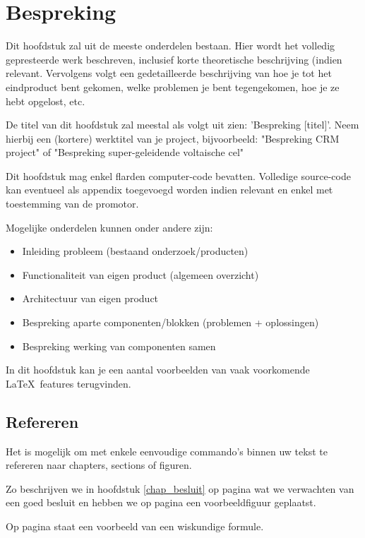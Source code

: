 \chapter[Bespreking]{Bespreking}
\label{chap_bespreking}

Dit hoofdstuk zal uit de meeste onderdelen bestaan. Hier wordt het volledig gepresteerde werk beschreven, inclusief korte theoretische beschrijving (indien relevant. 
Vervolgens volgt een gedetailleerde beschrijving van hoe je tot het eindproduct bent gekomen, welke problemen je bent tegengekomen, hoe je ze hebt opgelost, etc.

De titel van dit hoofdstuk zal meestal als volgt uit zien: 'Bespreking [titel]'. Neem hierbij een (kortere) werktitel van je project, bijvoorbeeld: "Bespreking CRM project" of "Bespreking super-geleidende voltaische cel"

Dit hoofdstuk mag enkel flarden computer-code bevatten. Volledige source-code kan eventueel als appendix toegevoegd worden indien relevant en enkel met toestemming van de promotor.

Mogelijke onderdelen kunnen onder andere zijn:
\begin{itemize}
  \item Inleiding probleem (bestaand onderzoek/producten) 
  \item Functionaliteit van eigen product (algemeen overzicht)
  \item Architectuur van eigen product
  \item Bespreking aparte componenten/blokken (problemen + oplossingen)
  \item Bespreking werking van componenten samen
\end{itemize}


In dit hoofdstuk kan je een aantal voorbeelden van vaak voorkomende \LaTeX\ features terugvinden.

\section{Refereren}

Het is mogelijk om met enkele eenvoudige commando's binnen uw tekst te refereren naar chapters, sections of figuren. 

Zo beschrijven we in hoofdstuk \ref{chap_besluit} op pagina \pageref{chap_besluit} wat we verwachten van een goed besluit en hebben we op pagina \pageref{fig_voorbeeld1} een voorbeeldfiguur geplaatst.  

Op pagina \pageref{eq:polynoom} staat een voorbeeld van een wiskundige formule.

